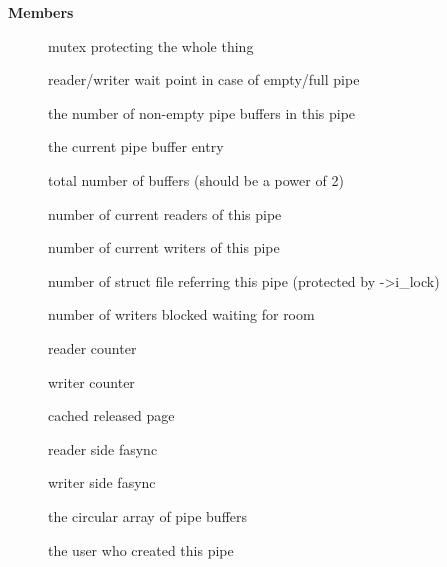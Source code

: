 \documentclass[a4paper,8pt,english]{sphinxmanual}
\begin{document}
\textbf{Members}
\begin{description}
\item[{}] \leavevmode
mutex protecting the whole thing

\item[{}] \leavevmode
reader/writer wait point in case of empty/full pipe

\item[{}] \leavevmode
the number of non-empty pipe buffers in this pipe

\item[{}] \leavevmode
the current pipe buffer entry

\item[{}] \leavevmode
total number of buffers (should be a power of 2)

\item[{}] \leavevmode
number of current readers of this pipe

\item[{}] \leavevmode
number of current writers of this pipe

\item[{}] \leavevmode
number of struct file referring this pipe (protected by -\textgreater{}i\_lock)

\item[{}] \leavevmode
number of writers blocked waiting for room

\item[{}] \leavevmode
reader counter

\item[{}] \leavevmode
writer counter

\item[{}] \leavevmode
cached released page

\item[{}] \leavevmode
reader side fasync

\item[{}] \leavevmode
writer side fasync

\item[{}] \leavevmode
the circular array of pipe buffers

\item[{}] \leavevmode
the user who created this pipe

\end{description}
\end{document}
